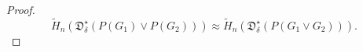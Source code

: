 \documentclass[10pt,a4paper]{amsart}
\newcommand{\FD}{\mathfrak{D}}
\begin{document}
\begin{proof}
    \[
    \tilde{H}_n(\FD^\star_\delta(P(G_1)\vee P(G_2)))
    \approx
    \tilde{H}_n(\FD^\star_\delta(P(G_1\vee G_2))).
    \]








    

\end{proof}
\end{document}
